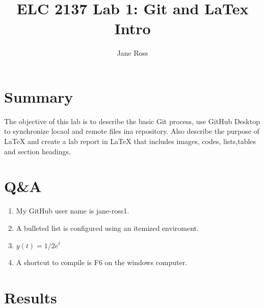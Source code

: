 \documentclass[11pt]{article}
\begin{document}
\title{ELC 2137 Lab 1: Git and LaTex Intro}
\author{Jane Ross}

\maketitle


\section*{Summary}

The objective of this lab is to describe the basic Git process, use GitHub Desktop to synchronize locaol and remote files ina repository. Also describe the purpose of LaTeX and create a lab report in LaTeX that includes images, codes, lists,tables and section headings. 


\section*{Q\&A}

\begin{enumerate}
	\item 
	My GitHub user name is jane-ross1.
	\item
	A bulleted list is configured using an itemized enviroment.
	\item 
		$ y(t) = 1/2 e^t $
	\item 
	A shortcut to compile is F6 on the windows computer.
	
\end{enumerate}


\section*{Results}
\end{document}
